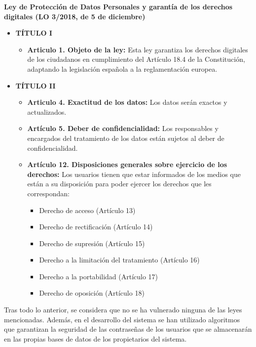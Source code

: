 \vspace{.5cm}\noindent\textbf{Ley de Protección de Datos Personales y garantía de los derechos digitales (LO 3/2018, de 5 de diciembre)}~\cite{jefatura_del_estado_ley_2018}
\begin{itemize}
	\item \textbf{TÍTULO I}
	      \begin{itemize}
		      \item \textbf{Articulo 1. Objeto de la ley:} Esta ley garantiza los derechos digitales de los ciudadanos en cumplimiento del Artículo 18.4 de la Constitución, adaptando la legislación española a la reglamentación europea.
	      \end{itemize}
	\item \textbf{TÍTULO II}
	      \begin{itemize}
		      \item \textbf{Articulo 4. Exactitud de los datos:} Los datos serán exactos y actualizados.
		      \item \textbf{Artículo 5. Deber de confidencialidad:} Los responsables y encargados del tratamiento de los datos están sujetos al deber de confidencialidad.
		      \item \textbf{Artículo 12. Disposiciones generales sobre ejercicio de los derechos:} Los usuarios tienen que estar informados de los medios que están a su disposición para poder ejercer los derechos que les correspondan:
		            \begin{itemize}
			            \item Derecho de acceso (Artículo 13)
			            \item Derecho de rectificación (Artículo 14)
			            \item Derecho de supresión (Artículo 15)
			            \item Derecho a la limitación del tratamiento (Artículo 16)
			            \item Derecho a la portabilidad (Artículo 17)
			            \item Derecho de oposición (Artículo 18)
		            \end{itemize}
	      \end{itemize}
\end{itemize}

Tras todo lo anterior, se considera que no se ha vulnerado ninguna de las leyes mencionadas. Además, en el desarrollo del sistema se han utilizado algoritmos que garantizan la seguridad de las contraseñas de los usuarios que se almacenarán en las propias bases de datos de los propietarios del sistema.

